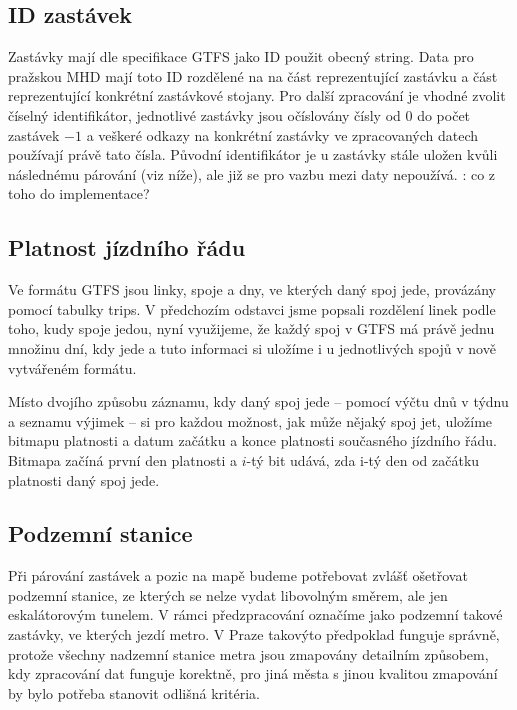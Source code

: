 \subsection{ID zastávek}
Zastávky mají dle specifikace GTFS jako ID použit obecný string. Data pro
pražskou MHD mají toto ID rozdělené na na část reprezentující zastávku a část
reprezentující konkrétní zastávkové stojany. Pro další zpracování je vhodné
zvolit číselný identifikátor, jednotlivé zastávky jsou očíslovány čísly od 0 do
počet zastávek $- 1$ a veškeré odkazy na konkrétní zastávky ve zpracovaných datech
používají právě tato čísla. Původní identifikátor je u zastávky stále uložen
kvůli následnému párování (viz níže), ale již se pro vazbu mezi daty nepoužívá.
\TODO: co z toho do implementace?

\subsection{Platnost jízdního řádu}
Ve formátu GTFS jsou linky, spoje a dny, ve kterých daný spoj jede, provázány
pomocí tabulky trips. V předchozím odstavci jsme popsali rozdělení linek podle
toho, kudy spoje jedou, nyní využijeme, že každý spoj v GTFS má právě jednu
množinu dní, kdy jede a tuto informaci si uložíme i u jednotlivých spojů v nově
vytvářeném formátu.

Místo dvojího způsobu záznamu, kdy daný spoj jede -- pomocí výčtu dnů v týdnu a
seznamu výjimek -- si pro každou možnost, jak může nějaký spoj jet, uložíme
bitmapu platnosti a datum začátku a konce platnosti současného jízdního řádu. 
Bitmapa začíná první den platnosti a $i$-tý bit udává, zda i-tý den od začátku
platnosti daný spoj jede.  

\subsection{Podzemní stanice}
Při párování zastávek a pozic na mapě budeme potřebovat zvlášť ošetřovat
podzemní stanice, ze kterých se nelze vydat libovolným směrem, ale jen
eskalátorovým tunelem. V rámci předzpracování označíme jako podzemní takové
zastávky, ve kterých jezdí metro. V Praze takovýto předpoklad funguje správně,
protože všechny nadzemní stanice metra jsou zmapovány detailním způsobem, kdy
zpracování dat funguje korektně, pro jiná města s jinou kvalitou zmapování by
bylo potřeba stanovit odlišná kritéria.


